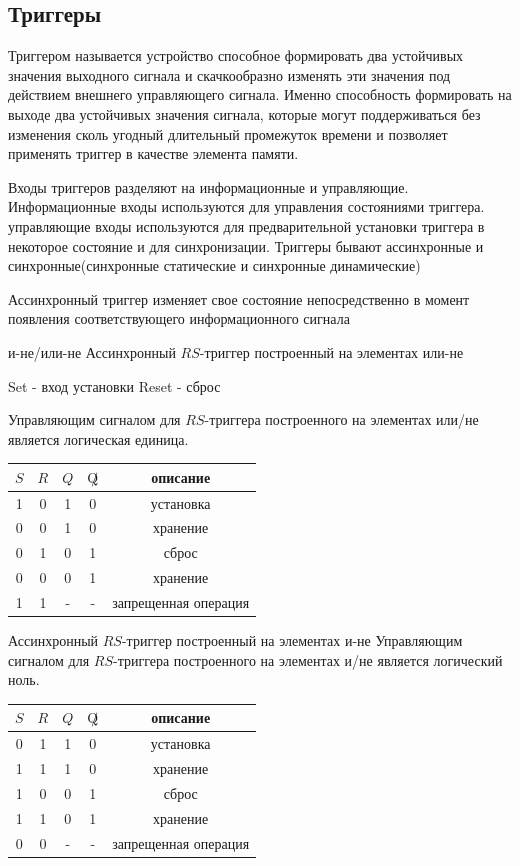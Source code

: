 \documentclass[a4paper]{article}
\begin{document}
\subsection{Триггеры}
Триггером называется устройство способное формировать два устойчивых значения выходного сигнала и скачкообразно изменять эти значения под действием внешнего управляющего сигнала.
Именно способность формировать на выходе два устойчивых значения сигнала, которые могут поддерживаться без изменения сколь угодный длительный промежуток времени и позволяет применять триггер в качестве элемента памяти. 

Входы триггеров разделяют на информационные и управляющие. Информационные входы используются для управления состояниями триггера. управляющие входы используются для предварительной установки триггера в некоторое состояние и для синхронизации.
Триггеры бывают ассинхронные и синхронные(синхронные статические и синхронные динамические)

Ассинхронный триггер изменяет свое состояние непосредственно в момент появления соответствующего информационного сигнала

и-не/или-не
Ассинхронный $RS$-триггер построенный на элементах или-не 

Set - вход установки
Reset - сброс

Управляющим сигналом для $RS$-триггера построенного на элементах или/не является логическая единица.

\begin{table}[ht]
\centering
\begin{tabular}{|c|c|c|c|c|}
    \hline
    $S$ & $R$ & $Q$ & $\not Q$ & описание \\
    \hline
    1 & 0 & 1 & 0 & установка\\
    0 & 0 & 1 & 0 & хранение\\
    0 & 1 & 0 & 1 & сброс \\
    0 & 0 & 0 & 1 & хранение \\
    1 & 1 & - & - & запрещенная операция \\
    \hline
\end{tabular}
\end{table}

Ассинхронный $RS$-триггер построенный на элементах и-не 
Управляющим сигналом для $RS$-триггера построенного на элементах и/не является логический ноль.

\begin{table}[ht]
\centering
\begin{tabular}{|c|c|c|c|c|}
    \hline
    $S$ & $R$ & $Q$ & $\not Q$ & описание \\
    \hline
    0 & 1 & 1 & 0 & установка\\
    1 & 1 & 1 & 0 & хранение\\
    1 & 0 & 0 & 1 & сброс \\
    1 & 1 & 0 & 1 & хранение \\
    0 & 0 & - & - & запрещенная операция \\
    \hline
\end{tabular}
\end{table}
\end{document}
